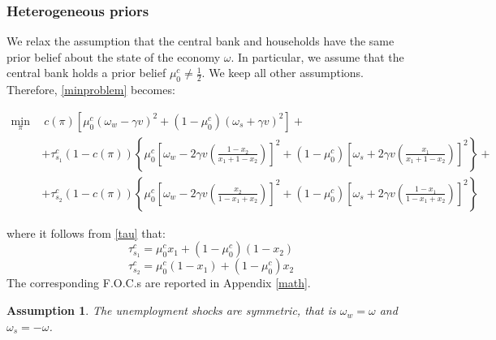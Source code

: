 \documentclass[12pt,a4paper]{article}
\newtheorem{assumption}{Assumption}
\begin{document}
\subsubsection{Heterogeneous priors}
We relax the assumption that the central bank and households have the same prior belief about the state of the economy $\omega$. In particular, we assume that the central bank holds a prior belief $\mu_0^c\neq \frac{1}{2}$. We keep all other assumptions. Therefore, \eqref{minproblem} becomes:
\begin{small}
    \begin{equation}
    \begin{split}
    \min_{\pi} \ & \ c(\pi)\left[\mu_0^c(\omega_w-\gamma v)^2+(1-\mu_0^c)(\omega_s+\gamma v)^2\right]+\\
     &  +\tau_{s_1}^c(1-c(\pi))\left\{\mu_0^c\left[\omega_w-2\gamma v\left(\frac{1-x_2}{x_1+1-x_2}\right)\right]^2+(1-\mu_0^c)\left[\omega_s+2\gamma v\left(\frac{x_1}{x_1+1-x_2}\right)\right]^2\right\}+ \\
     & +\tau_{s_2}^c(1-c(\pi))\left\{\mu_0^c\left[\omega_w-2\gamma v\left(\frac{x_2}{1-x_1+x_2}\right)\right]^2+(1-\mu_0^c)\left[\omega_s+2\gamma v\left(\frac{1-x_1}{1-x_1+x_2}\right)\right]^2\right\}
    \end{split}
    \label{opt_heterogeneous_priors}
    \end{equation}
\end{small}
where it follows from \eqref{tau} that:
\begin{equation}
    \tau_{s_1}^c=\mu_0^c x_1 + (1-\mu_0^c)(1-x_2)
\end{equation}
\begin{equation}
    \tau_{s_2}^c=\mu_0^c (1-x_1) + (1-\mu_0^c)x_2
\end{equation}
The corresponding F.O.C.s are reported in Appendix \ref{math}.
\begin{assumption}
\label{Ass3}
    The unemployment shocks are symmetric, that is $\omega_w=\omega$ and $\omega_s=-\omega$.
\end{assumption}
\end{document}
